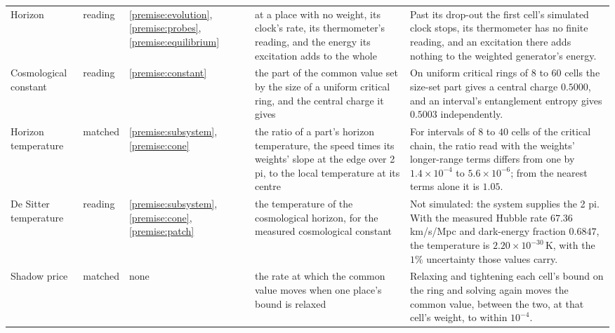 \begin{tabular}{p{1.0in}llp{2.1in}p{2.8in}}
\raggedright Horizon & reading & \ref{premise:evolution}, \ref{premise:probes}, \ref{premise:equilibrium} & \raggedright at a place with no weight, its clock's rate, its thermometer's reading, and the energy its excitation adds to the whole & \raggedright Past its drop-out the first cell's simulated clock stops, its thermometer has no finite reading, and an excitation there adds nothing to the weighted generator's energy. \tabularnewline
\raggedright Cosmological constant & reading & \ref{premise:constant} & \raggedright the part of the common value set by the size of a uniform critical ring, and the central charge it gives & \raggedright On uniform critical rings of $8$ to $60$ cells the size-set part gives a central charge $0.5000$, and an interval's entanglement entropy gives $0.5003$ independently. \tabularnewline
\raggedright Horizon temperature & matched & \ref{premise:subsystem}, \ref{premise:cone} & \raggedright the ratio of a part's horizon temperature, the speed times its weights' slope at the edge over 2 pi, to the local temperature at its centre & \raggedright For intervals of $8$ to $40$ cells of the critical chain, the ratio read with the weights' longer-range terms differs from one by $1.4\times10^{-4}$ to $5.6\times10^{-6}$; from the nearest terms alone it is $1.05$. \tabularnewline
\raggedright De Sitter temperature & reading & \ref{premise:subsystem}, \ref{premise:cone}, \ref{premise:patch} & \raggedright the temperature of the cosmological horizon, for the measured cosmological constant & \raggedright Not simulated: the system supplies the 2 pi. With the measured Hubble rate $67.36$ km/s/Mpc and dark-energy fraction $0.6847$, the temperature is $2.20\times10^{-30}\,\mathrm{K}$, with the $1\%$ uncertainty those values carry. \tabularnewline
\raggedright Shadow price & matched & none & \raggedright the rate at which the common value moves when one place's bound is relaxed & \raggedright Relaxing and tightening each cell's bound on the ring and solving again moves the common value, between the two, at that cell's weight, to within $10^{-4}$. \tabularnewline
\bottomrule
\end{tabular}

